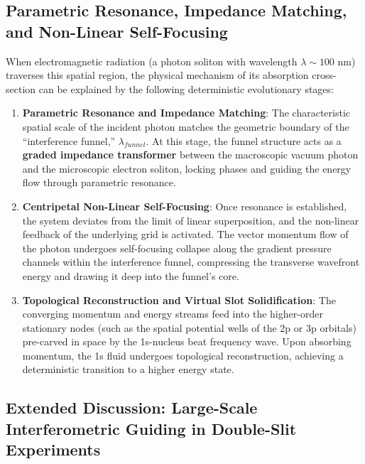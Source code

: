 \documentclass[12pt, a4paper]{article}
\begin{document}
\subsection{Parametric Resonance, Impedance Matching, and Non-Linear Self-Focusing}

When electromagnetic radiation (a photon soliton with wavelength $\lambda \sim 100 \text{ nm}$) traverses this spatial region, the physical mechanism of its absorption cross-section can be explained by the following deterministic evolutionary stages:
\begin{enumerate}
    \item \textbf{Parametric Resonance and Impedance Matching}: The characteristic spatial scale of the incident photon matches the geometric boundary of the ``interference funnel,'' $\lambda_{funnel}$. At this stage, the funnel structure acts as a \textbf{graded impedance transformer} between the macroscopic vacuum photon and the microscopic electron soliton, locking phases and guiding the energy flow through parametric resonance.
    \item \textbf{Centripetal Non-Linear Self-Focusing}: Once resonance is established, the system deviates from the limit of linear superposition, and the non-linear feedback of the underlying grid is activated. The vector momentum flow of the photon undergoes self-focusing collapse along the gradient pressure channels within the interference funnel, compressing the transverse wavefront energy and drawing it deep into the funnel's core.
    \item \textbf{Topological Reconstruction and Virtual Slot Solidification}: The converging momentum and energy streams feed into the higher-order stationary nodes (such as the spatial potential wells of the 2p or 3p orbitals) pre-carved in space by the 1s-nucleus beat frequency wave. Upon absorbing momentum, the 1s fluid undergoes topological reconstruction, achieving a deterministic transition to a higher energy state.
\end{enumerate}

\subsection{Extended Discussion: Large-Scale Interferometric Guiding in Double-Slit Experiments}
\end{document}
